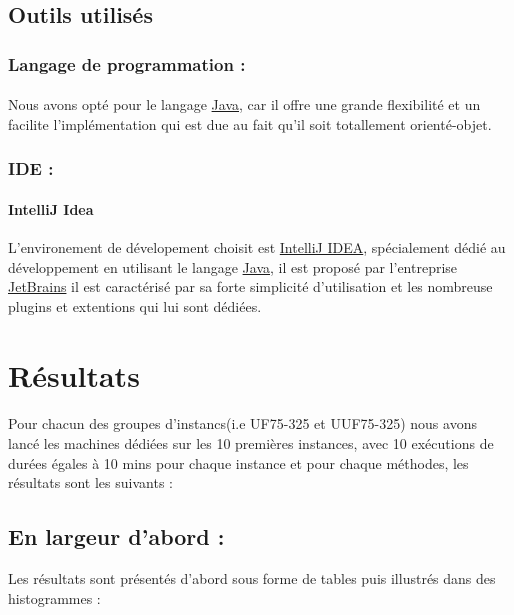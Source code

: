 \subsection{Outils utilisés}
\subsubsection{Langage de programmation : }
\paragraph{}
Nous avons opté pour le langage \href{https://fr.wikipedia.org/wiki/Java_(technique)}{Java}, car il offre une grande flexibilité et un facilite l'implémentation qui est due au fait qu'il soit totallement orienté-objet.
\subsubsection{IDE : }
\paragraph{IntelliJ Idea} L'environement de dévelopement choisit est \href{https://www.jetbrains.com/idea/}{IntelliJ IDEA}, spécialement dédié au développement en utilisant le langage \href{https://fr.wikipedia.org/wiki/Java_(technique)}{Java}, il est proposé par l'entreprise \href{https://www.jetbrains.com}{JetBrains} il est caractérisé par sa forte simplicité d'utilisation et les nombreuse plugins et extentions qui lui sont dédiées.

\section{Résultats}\label{tests}
\paragraph{}
Pour chacun des groupes d'instancs(i.e UF75-325 et UUF75-325) nous avons lancé les machines dédiées sur les 10 premières instances, avec 10 exécutions de durées égales à 10 mins pour chaque instance et pour chaque méthodes, les résultats sont les suivants : \\
\subsection{En largeur d'abord :}
Les résultats sont présentés d'abord sous forme de tables puis illustrés dans des histogrammes : 
